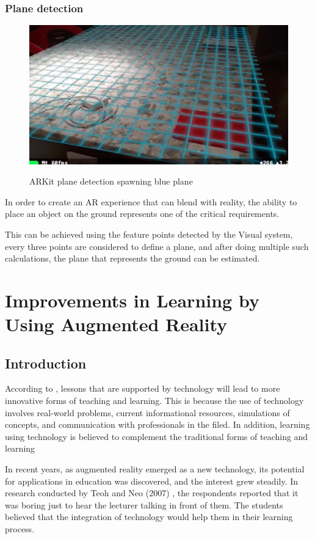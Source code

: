 \documentclass[12 pct]{report}
\begin{document}
\subsection*{Plane detection}
\begin{figure}[H]
\includegraphics[width=1\textwidth]{plane-detection}
\centering
\label{fig:plane-detection}
\caption{ARKit plane detection spawning blue plane}
\end{figure}

In order to create an AR experience that can blend with reality, the ability to place an object on the ground represents one of the critical requirements. 

This can be achieved using the feature points detected by the Visual system, every three points are considered to define a plane, and after doing multiple such calculations, the plane that represents the ground can be estimated.

\chapter{Improvements in Learning by Using Augmented Reality}
\section{Introduction}
According to \cite{shapley2011effects}, lessons that are supported by technology will lead to more innovative forms of teaching and learning. This is because the use of technology involves real-world problems, current informational resources, simulations of concepts, and communication with professionals in the filed. In addition, learning using technology is believed to complement the traditional forms of teaching and learning \cite{saidinar}

In recent years, as augmented reality emerged as a new technology, its potential for applications in education was discovered, and the interest grew steadily. In research conducted by Teoh and Neo (2007) \cite{teoh2007interactive}, the respondents reported that it was boring just to hear the lecturer talking in front of them. The students believed that the integration of technology would help them in their learning process.
\end{document}
